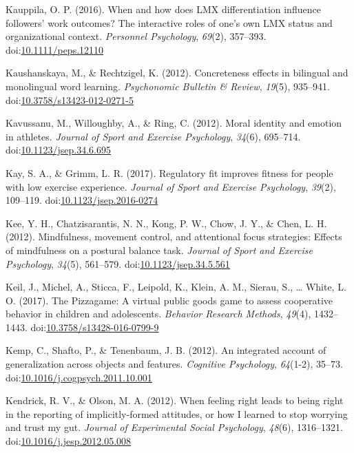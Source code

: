 \documentclass[english,man]{apa6}
\begin{document}
\hypertarget{ref-Kauppila2016}{}
Kauppila, O. P. (2016). When and how does LMX differentiation influence
followers' work outcomes? The interactive roles of one's own LMX status
and organizational context. \emph{Personnel Psychology}, \emph{69}(2),
357--393.
doi:\href{https://doi.org/10.1111/peps.12110}{10.1111/peps.12110}

\hypertarget{ref-Kaushanskaya2012}{}
Kaushanskaya, M., \& Rechtzigel, K. (2012). Concreteness effects in
bilingual and monolingual word learning. \emph{Psychonomic Bulletin \&
Review}, \emph{19}(5), 935--941.
doi:\href{https://doi.org/10.3758/s13423-012-0271-5}{10.3758/s13423-012-0271-5}

\hypertarget{ref-Kavussanu2012}{}
Kavussanu, M., Willoughby, A., \& Ring, C. (2012). Moral identity and
emotion in athletes. \emph{Journal of Sport and Exercise Psychology},
\emph{34}(6), 695--714.
doi:\href{https://doi.org/10.1123/jsep.34.6.695}{10.1123/jsep.34.6.695}

\hypertarget{ref-Kay2017}{}
Kay, S. A., \& Grimm, L. R. (2017). Regulatory fit improves fitness for
people with low exercise experience. \emph{Journal of Sport and Exercise
Psychology}, \emph{39}(2), 109--119.
doi:\href{https://doi.org/10.1123/jsep.2016-0274}{10.1123/jsep.2016-0274}

\hypertarget{ref-Kee2012}{}
Kee, Y. H., Chatzisarantis, N. N., Kong, P. W., Chow, J. Y., \& Chen, L.
H. (2012). Mindfulness, movement control, and attentional focus
strategies: Effects of mindfulness on a postural balance task.
\emph{Journal of Sport and Exercise Psychology}, \emph{34}(5), 561--579.
doi:\href{https://doi.org/10.1123/jsep.34.5.561}{10.1123/jsep.34.5.561}

\hypertarget{ref-Keil2017}{}
Keil, J., Michel, A., Sticca, F., Leipold, K., Klein, A. M., Sierau, S.,
\ldots{} White, L. O. (2017). The Pizzagame: A virtual public goods game
to assess cooperative behavior in children and adolescents.
\emph{Behavior Research Methods}, \emph{49}(4), 1432--1443.
doi:\href{https://doi.org/10.3758/s13428-016-0799-9}{10.3758/s13428-016-0799-9}

\hypertarget{ref-Kemp2012}{}
Kemp, C., Shafto, P., \& Tenenbaum, J. B. (2012). An integrated account
of generalization across objects and features. \emph{Cognitive
Psychology}, \emph{64}(1-2), 35--73.
doi:\href{https://doi.org/10.1016/j.cogpsych.2011.10.001}{10.1016/j.cogpsych.2011.10.001}

\hypertarget{ref-Kendrick2012}{}
Kendrick, R. V., \& Olson, M. A. (2012). When feeling right leads to
being right in the reporting of implicitly-formed attitudes, or how I
learned to stop worrying and trust my gut. \emph{Journal of Experimental
Social Psychology}, \emph{48}(6), 1316--1321.
doi:\href{https://doi.org/10.1016/j.jesp.2012.05.008}{10.1016/j.jesp.2012.05.008}
\end{document}
